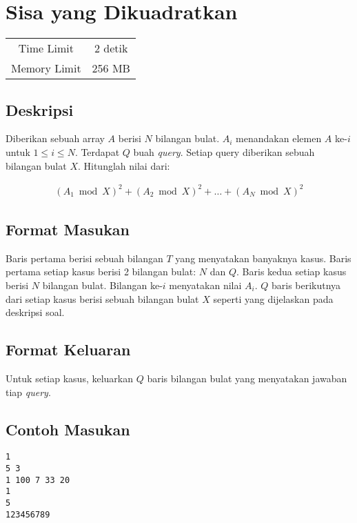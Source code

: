 \documentclass{article}
\begin{document}
\section*{\hfil Sisa yang Dikuadratkan\hfil}

\begin{center}
\begin{tabular}{ |cc| } 
 \hline
 Time Limit & 2 detik \\ 
 Memory Limit & 256 MB \\
 \hline
\end{tabular}
\end{center}

\subsection*{Deskripsi}
Diberikan sebuah array $A$ berisi $N$ bilangan bulat. $A_{i}$ menandakan elemen $A$ ke-$i$ untuk $1 \leq i \leq N$. Terdapat $Q$ buah \textit{query}. Setiap query diberikan sebuah bilangan bulat $X$. Hitunglah nilai dari:

\begin{gather*} 
(A_{1} \bmod X)^2 + (A_{2} \bmod X)^2 + \dots + (A_{N} \bmod X)^2
\end{gather*} 

\subsection*{Format Masukan}
\par Baris pertama berisi sebuah bilangan $T$ yang menyatakan banyaknya kasus.
\newline Baris pertama setiap kasus berisi 2 bilangan bulat: $N$ dan $Q$.
\newline Baris kedua setiap kasus berisi $N$ bilangan bulat. Bilangan ke-$i$ menyatakan nilai $A_{i}$.
\newline $Q$ baris berikutnya dari setiap kasus berisi sebuah bilangan bulat $X$ seperti yang dijelaskan pada deskripsi soal.

\subsection*{Format Keluaran}

\par Untuk setiap kasus, keluarkan $Q$ baris bilangan bulat yang menyatakan jawaban tiap \textit{query}.

\subsection*{Contoh Masukan}
\begin{lstlisting}
1
5 3
1 100 7 33 20
1
5
123456789
\end{lstlisting}
\end{document}
